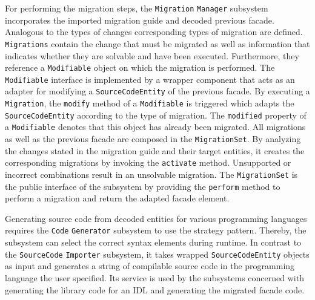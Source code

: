 For performing the migration steps, the \texttt{Migration} \texttt{Manager} subsystem incorporates the imported migration guide and decoded previous facade. Analogous to the types of changes corresponding types of migration are defined. \texttt{Migrations} contain the change that must be migrated as well as information that indicates whether they are solvable and have been executed. Furthermore, they reference a \texttt{Modifiable} object on which the migration is performed. The \texttt{Modifiable} interface is implemented by a wrapper component that acts as an adapter for modifying a \texttt{SourceCodeEntity} of the previous facade. By executing a \texttt{Migration}, the \texttt{modify} method of a \texttt{Modifiable} is triggered which adapts the \texttt{SourceCodeEntity} according to the type of migration. The \texttt{mo\-di\-fied} property of a \texttt{Modifiable} denotes that this object has already been migrated. All migrations as well as the previous facade are composed in the \texttt{MigrationSet}. By analyzing the changes stated in the migration guide and their target entities, it creates the corresponding migrations by invoking the \texttt{ac\-ti\-vate} method. Unsupported or incorrect combinations result in an unsolvable migration. The \texttt{MigrationSet} is the public interface of the subsystem by providing the \texttt{perform} method to perform a migration and return the adapted facade element.

\begin{figure}[!h]
\end{figure}

Generating source code from decoded entities for various programming languages requires the \texttt{Code} \texttt{Generator} subsystem to use the strategy pattern. Thereby, the subsystem can select the correct syntax elements during runtime. In contrast to the \texttt{SourceCode} \texttt{Importer} subsystem, it takes wrapped \texttt{SourceCodeEntity} objects as input and generates a string of compilable source code in the programming language the user specified. Its service is used by the subsystems concerned with generating the library code for an IDL and generating the migrated facade code.

